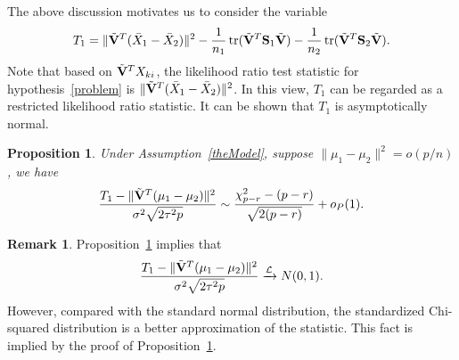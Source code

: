 \documentclass[review]{elsarticle}
\DeclareMathOperator{\mytr}{tr}
\theoremstyle{plain}
\newtheorem{proposition}{\quad\quad Proposition}
\theoremstyle{definition}
\newtheorem{remark}{\quad\quad Remark}
\theoremstyle{remark}
\begin{document}
The above discussion motivates us to consider the variable
\begin{equation*}
\begin{aligned}
    T_1=\|\tilde{\BV}^T(\bar{X}_1-\bar{X}_2)\|^2-\frac{1}{n_1}\mytr(\tilde{\BV}^T \BS_1\tilde{\BV})-\frac{1}{n_2}\mytr(\tilde{\BV}^T \BS_2\tilde{\BV}).
    \\
\end{aligned}
\end{equation*}
 Note that based on $\tilde{\mathbf{V}}^T X_{ki}$, the likelihood ratio test statistic for hypothesis~\eqref{problem} is 
    $\|\tilde{\mathbf{V}}^T (\bar{X}_1-\bar{X}_2)\|^2$. 
    In this view, $T_1$ can be regarded as a restricted likelihood ratio statistic.
It can be shown that $T_1$ is asymptotically normal.
\begin{proposition}\label{oracleTheorem}
    Under Assumption~\ref{theModel}, suppose $\|\mu_1-\mu_2\|^2= o(p/n)$, we have 
    \begin{equation*}
        \frac{T_1-\|\tilde{\BV}^T(\mu_1-\mu_2)\|^2}
        {\sigma^2\sqrt{2\tau^2 p}}%
        \sim \frac{\chi^2_{p-r}-(p-r)}{\sqrt{2(p-r)}}+o_P(1).
    \end{equation*}
\end{proposition}
\begin{remark}
    Proposition~\ref{oracleTheorem} implies that
    $$
        \frac{T_1-\|\tilde{\mathbf{V}}^T(\mu_1-\mu_2)\|^2}
        {\sigma^2\sqrt{2\tau^2 p}}\xrightarrow{\mathcal{L}}N(0,1).
    $$
    However, compared with the standard normal distribution, the standardized Chi-squared distribution is a better approximation of the statistic.
    This fact is implied by the proof of Proposition~\ref{oracleTheorem}.
\end{remark}








\end{document}
